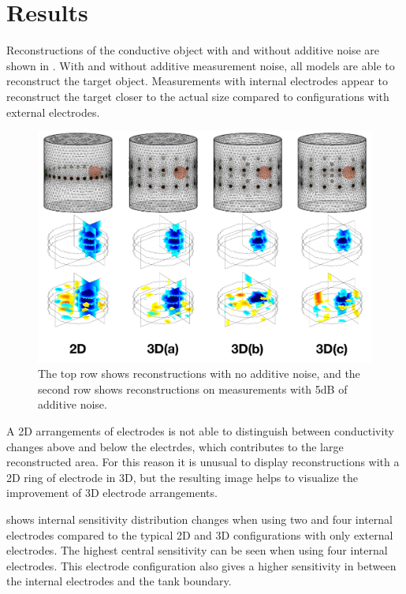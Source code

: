 \section{Results}

Reconstructions of the conductive object with and without additive noise are 
shown in . With and without additive measurement noise,
all models are able to reconstruct the target object. 
Measurements with internal electrodes appear to reconstruct the target 
closer to the actual size compared to configurations with external electrodes.

\begin{figure}[H]
\centering
\includegraphics[width=\textwidth]{chapter6-internal_electrodes/imgs/Image_Comparison.pdf}
\caption[Internal electrode simulation reconstructions]{The top row shows reconstructions with no additive noise, and the second row shows reconstructions on measurements with 5dB of
additive noise.}
\label{fig:reconstruction_comparison}
\end{figure}

A 2D arrangements of electrodes is not able to distinguish between 
conductivity changes above and below the electrdes, which contributes to the large
reconstructed area. For this reason it is unusual to display reconstructions 
with a 2D ring of electrode in 3D, but the resulting image helps to visualize the
improvement of 3D electrode arrangements.

 shows internal sensitivity distribution changes when 
using two and four internal electrodes compared to the
typical 2D and 3D configurations with only external electrodes. 
The highest central sensitivity can be seen when using four internal 
electrodes. This electrode configuration also 
gives a higher sensitivity in between the internal electrodes
and the tank boundary.

